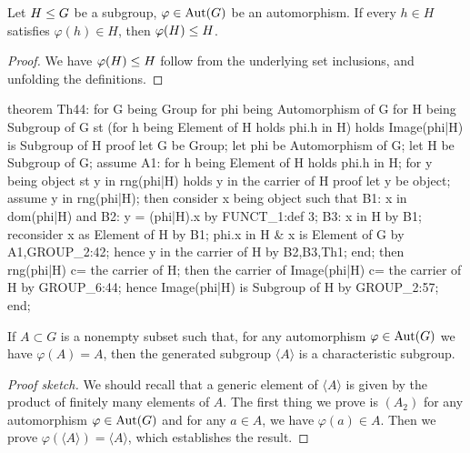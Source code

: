 \begin{theorem}
Let $H\leq G$ be a subgroup, $\varphi\in\operatorname{Aut}(G)$ be an automorphism.
If every $h\in H$ satisfies $\varphi(h)\in H$, then $\varphi(H)\leq H$.
\end{theorem}

\begin{proof}
We have $\varphi(H)\leq H$ follow from the underlying set
inclusions, and unfolding the definitions.
\end{proof}

\nwenddocs{}\endmoddef\nwstartdeflinemarkup{}\nwenddeflinemarkup
theorem Th44:
  for G being Group
  for phi being Automorphism of G
  for H being Subgroup of G
  st (for h being Element of H
      holds phi.h in H)
  holds Image(phi|H) is Subgroup of H
proof
  let G be Group;
  let phi be Automorphism of G;
  let H be Subgroup of G;
  assume A1: for h being Element of H holds phi.h in H;
  for y being object st y in rng(phi|H) holds y in the carrier of H
  proof
    let y be object;
    assume y in rng(phi|H);
    then consider x being object such that
    B1: x in dom(phi|H) and
    B2: y = (phi|H).x
    by FUNCT_1:def 3;
    B3: x in H by B1;
    reconsider x as Element of H by B1;
    phi.x in H & x is Element of G by A1,GROUP_2:42;
    hence y in the carrier of H by B2,B3,Th1;
  end;
  then rng(phi|H) c= the carrier of H;
  then the carrier of Image(phi|H) c= the carrier of H by GROUP_6:44;
  hence Image(phi|H) is Subgroup of H by GROUP_2:57;
end;
\eatline
{}\nwendcode{}\nwdocspar
\begin{theorem}
If $A\subset G$ is a nonempty subset such that, for any automorphism
$\varphi\in\operatorname{Aut}(G)$ we have $\varphi(A) = A$, then the generated
subgroup $\langle A\rangle$ is a characteristic subgroup.
\end{theorem}

\begin{proof}[Proof sketch]
We should recall that a generic element of $\langle A\rangle$ is given
by the product of finitely many elements of $A$. The first thing we
prove is $(A_{2})$ for any automorphism $\varphi\in\operatorname{Aut}(G)$ and for any
$a\in A$, we have $\varphi(a)\in A$. Then we prove
$\varphi(\langle A\rangle)=\langle A\rangle$, which establishes the result.
\end{proof}

